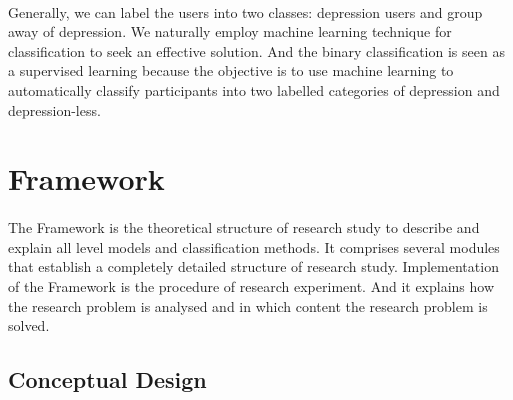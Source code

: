 \documentclass[runningheads]{llncs}
\begin{document}
\paragraph{}
%
Generally, we can label the users into two classes: depression users and group away of depression. We naturally employ machine learning technique for classification to seek an effective solution. And the binary classification is seen as a supervised learning because the objective is to use machine learning to automatically classify participants into two labelled categories of depression and depression-less.
%
%
%
%
%
\pagebreak
\section{Framework}
%
\paragraph{}
The Framework is the theoretical structure of research study to describe and explain all level models and classification methods. It comprises several modules that establish a completely detailed structure of research study. Implementation of the Framework is the procedure of research experiment. And it explains how the research problem is analysed and in which content the research problem is solved. 
%
\subsection{Conceptual Design}
%
\end{document}
